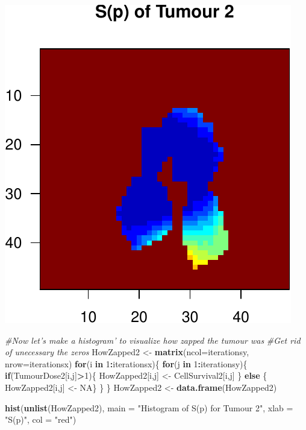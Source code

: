 \documentclass[]{article}
\newenvironment{Shaded}{\begin{snugshade}}{\end{snugshade}}
\newcommand{\KeywordTok}[1]{\textcolor[rgb]{0.13,0.29,0.53}{\textbf{#1}}}
\newcommand{\DataTypeTok}[1]{\textcolor[rgb]{0.13,0.29,0.53}{#1}}
\newcommand{\DecValTok}[1]{\textcolor[rgb]{0.00,0.00,0.81}{#1}}
\newcommand{\StringTok}[1]{\textcolor[rgb]{0.31,0.60,0.02}{#1}}
\newcommand{\CommentTok}[1]{\textcolor[rgb]{0.56,0.35,0.01}{\textit{#1}}}
\newcommand{\OtherTok}[1]{\textcolor[rgb]{0.56,0.35,0.01}{#1}}
\newcommand{\ControlFlowTok}[1]{\textcolor[rgb]{0.13,0.29,0.53}{\textbf{#1}}}
\newcommand{\OperatorTok}[1]{\textcolor[rgb]{0.81,0.36,0.00}{\textbf{#1}}}
\newcommand{\NormalTok}[1]{#1}
\begin{document}
\begin{center}\includegraphics{TumourSurvival_files/figure-latex/unnamed-chunk-13-3} \end{center}

\begin{Shaded}
\begin{Highlighting}[]
\CommentTok{#Now let's make a histogram' to visualize how zapped the tumour was}
\CommentTok{#Get rid of unecessary the zeros}
\NormalTok{HowZapped2 <-}\StringTok{ }\KeywordTok{matrix}\NormalTok{(}\DataTypeTok{ncol=}\NormalTok{iterationsy, }\DataTypeTok{nrow=}\NormalTok{iterationsx)}
\ControlFlowTok{for}\NormalTok{(i }\ControlFlowTok{in} \DecValTok{1}\OperatorTok{:}\NormalTok{iterationsx)\{}
  \ControlFlowTok{for}\NormalTok{(j }\ControlFlowTok{in} \DecValTok{1}\OperatorTok{:}\NormalTok{iterationsy)\{}
    \ControlFlowTok{if}\NormalTok{(TumourDose2[i,j]}\OperatorTok{>}\DecValTok{1}\NormalTok{)\{}
\NormalTok{      HowZapped2[i,j] <-}\StringTok{ }\NormalTok{CellSurvival2[i,j]}
\NormalTok{    \} }\ControlFlowTok{else}\NormalTok{ \{}
\NormalTok{      HowZapped2[i,j] <-}\StringTok{ }\OtherTok{NA}\NormalTok{\}}
\NormalTok{  \}}
\NormalTok{\}}
\NormalTok{HowZapped2 <-}\StringTok{ }\KeywordTok{data.frame}\NormalTok{(HowZapped2)}

\KeywordTok{hist}\NormalTok{(}\KeywordTok{unlist}\NormalTok{(HowZapped2), }\DataTypeTok{main =} \StringTok{"Histogram of S(p) for Tumour  2"}\NormalTok{, }\DataTypeTok{xlab =} \StringTok{"S(p)"}\NormalTok{, }\DataTypeTok{col =} \StringTok{"red"}\NormalTok{)}
\end{Highlighting}
\end{Shaded}
\end{document}
